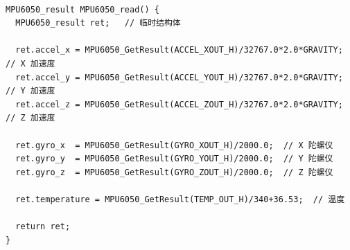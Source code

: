 \begin{verbatim}

MPU6050_result MPU6050_read() {
  MPU6050_result ret;   // 临时结构体

  ret.accel_x = MPU6050_GetResult(ACCEL_XOUT_H)/32767.0*2.0*GRAVITY;  // X 加速度
  ret.accel_y = MPU6050_GetResult(ACCEL_YOUT_H)/32767.0*2.0*GRAVITY;  // Y 加速度
  ret.accel_z = MPU6050_GetResult(ACCEL_ZOUT_H)/32767.0*2.0*GRAVITY;  // Z 加速度

  ret.gyro_x  = MPU6050_GetResult(GYRO_XOUT_H)/2000.0;  // X 陀螺仪
  ret.gyro_y  = MPU6050_GetResult(GYRO_YOUT_H)/2000.0;  // Y 陀螺仪
  ret.gyro_z  = MPU6050_GetResult(GYRO_ZOUT_H)/2000.0;  // Z 陀螺仪

  ret.temperature = MPU6050_GetResult(TEMP_OUT_H)/340+36.53;  // 温度

  return ret;
}

\end{verbatim}


